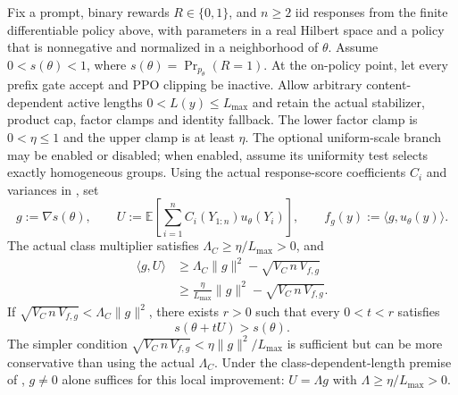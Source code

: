 \begin{corollary}
\label{cor:binary-local-improvement}
Fix a prompt, binary rewards $R\in\{0,1\}$, and $n\ge2$ iid responses
from the finite differentiable policy above, with parameters in a real
Hilbert space and a policy that is nonnegative and normalized in a
neighborhood of $\theta$. Assume $0<s(\theta)<1$, where
$s(\theta)=\Pr_{p_\theta}(R=1)$. At the on-policy point, let every prefix
gate accept and PPO clipping be inactive. Allow arbitrary content-dependent
active lengths $0<L(y)\le L_{\max}$ and retain the actual stabilizer,
product cap, factor clamps and identity fallback. The lower factor clamp
is $0<\eta\le1$ and the upper clamp is at least $\eta$.
The optional uniform-scale branch may be enabled or disabled; when enabled,
assume its uniformity test selects exactly homogeneous groups.
Using the actual response-score coefficients $C_i$ and variances in
, set
\begin{equation*}
 g:=\nabla s(\theta),\qquad
 U:=\mathbb E\!\left[\sum_{i=1}^n C_i(Y_{1:n})u_\theta(Y_i)\right],
 \qquad f_g(y):=\langle g,u_\theta(y)\rangle.
\end{equation*}
The actual class multiplier satisfies $\Lambda_C\ge\eta/L_{\max}>0$, and
\begin{align*}
 \langle g,U\rangle
 &\ge \Lambda_C\|g\|^2-\sqrt{V_C\,n\,V_{f,g}}\\
 &\ge \frac{\eta}{L_{\max}}\|g\|^2-\sqrt{V_C\,n\,V_{f,g}}.
\end{align*}
If $\sqrt{V_C\,n\,V_{f,g}}<\Lambda_C\|g\|^2$, there exists
$r>0$ such that every $0<t<r$ satisfies
\begin{equation*}
 s(\theta+tU)>s(\theta).
\end{equation*}
The simpler condition
$\sqrt{V_C\,n\,V_{f,g}}<\eta\|g\|^2/L_{\max}$ is sufficient but can
be more conservative than using the actual $\Lambda_C$.
Under the class-dependent-length premise of
, $g\ne0$ alone suffices for this local
improvement: $U=\Lambda g$ with $\Lambda\ge\eta/L_{\max}>0$.
\end{corollary}

